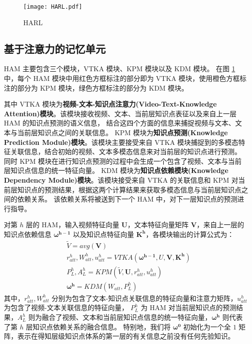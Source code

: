     \begin{figure}[htb]
        \centering
        \texttt{[image: HARL.pdf]}
        \caption{HARL}
        \label{fig3.2}
    \end{figure}

\subsection{基于注意力的记忆单元}
    HAM 主要包含三个模块，VTKA 模块、KPM 模块以及 KDM 模块。
    在图 \ref{fig3.2} 中，每个 HAM 模块中用红色方框标注的部分即为 VTKA 模块，使用橙色方框标注的部分为 KPM 模块，绿色方框标注的部分为 KDM 模块。

    其中 VTKA 模块为\textbf{视频-文本-知识点注意力(Video-Text-Knowledge Attention)模块}。该模块接收视频、文本、当前层知识点表征以及来自上一层 HAM 的知识点预测的语义信息，
    结合这四个方面的信息来捕捉视频与文本、文本与当前层知识点之间的关联信息。
    KPM 模块为\textbf{知识点预测(Knowledge Prediction Module)模块}。该模块主要接受来自 VTKA 模块捕捉到的多模态特征关联信息，结合初始的视频、文本多模态信息来对当前层的知识点进行预测。
    同时 KPM 模块在进行知识点预测的过程中会生成一个包含了视频、文本与当前层知识点信息的统一特征向量。
    KDM 模块为\textbf{知识点依赖模块(Knowledge Dependency Module)模块}。该模块接受来自 VTKA 的关联信息和 KPM 对当前层知识点的预测结果，根据这两个计算结果来获取多模态信息与当前层知识点之间的依赖关系。
    该依赖关系将被送到下一个 HAM 中，对下一层知识点的预测进行指导。

    对第 $h$ 层的 HAM，输入视频特征向量 $\boldsymbol{U}$，文本特征向量矩阵 $\boldsymbol{V}$，来自上一层的知识点依赖信息 $\boldsymbol{\omega^{h - 1}}$ 以及知识点特征向量 $\boldsymbol{K^h}$，各模块输出的计算公式为：
    \begin{equation}
        \begin{aligned}
            &\tilde{V} = avg(\boldsymbol{V}) \\
            &r_{att}^h, W_{att}^h, u_{att}^h = VTKA(\boldsymbol{\omega^{h - 1}}, U, \boldsymbol{V}, \boldsymbol{K^h}) \\
            &P_L^h, A_L^h = KPM(\tilde{V}, \boldsymbol{U}, r_{att}^h, u_{att}^h) \\
            &\boldsymbol{\omega^h} = KDM(W_{att}, P_L^h)
        \end{aligned}
    \end{equation}
    其中，$r_{att}^{h}, W_{att}^h$ 分别为包含了文本-知识点关联信息的特征向量和注意力矩阵，$u_{att}^h$ 为包含了视频-文本关联信息的特征向量，
    $P_L^h$ 为 HAM 对当前层知识点的预测结果，$A_L^h$ 则为融合了视频、文本和当前层知识点信息的统一特征向量，$\boldsymbol{\omega^h}$ 则代表了第 $h$ 层知识点依赖关系的融合信息。
    特别地，我们将 $\boldsymbol{\omega^0}$ 初始化为一个全 $1$ 矩阵，表示在得知层级知识点体系的第一层的有关信息之前没有任何先验知识。

